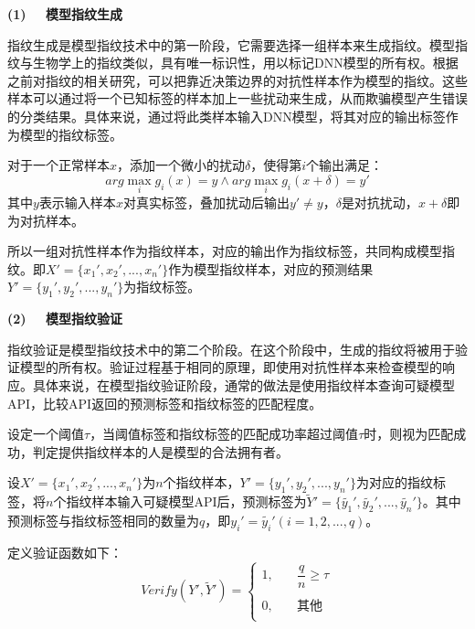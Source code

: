 \noindent\textbf{(1) \ \ 模型指纹生成}

指纹生成是模型指纹技术中的第一阶段，它需要选择一组样本来生成指纹。模型指纹与生物学上的指纹类似，具有唯一标识性，用以标记DNN模型的所有权。根据之前对指纹的相关研究\cite{zhao2020afa,lukas2019deep,cao2021ipguard}，可以把靠近决策边界的对抗性样本作为模型的指纹。这些样本可以通过将一个已知标签的样本加上一些扰动来生成，从而欺骗模型产生错误的分类结果。具体来说，通过将此类样本输入DNN模型，将其对应的输出标签作为模型的指纹标签。

对于一个正常样本$x$，添加一个微小的扰动$\delta$，使得第$i$个输出满足：
\begin{equation}
	\label{eq:4}
	arg \mathop{max} \limits_i g_i(x) = y \wedge arg \mathop{max} \limits_i g_i(x + \delta) = y'
\end{equation}
其中$y$表示输入样本$x$对真实标签，叠加扰动后输出$y' \neq y$，$\delta$是对抗扰动，$x + \delta$即为对抗样本。

所以一组对抗性样本作为指纹样本，对应的输出作为指纹标签，共同构成模型指纹。即$X' = \{x_1',x_2',...,x_n'\}$作为模型指纹样本，对应的预测结果$Y' = \{y_1', y_2',...,y_n'\}$为指纹标签。

\noindent\textbf{(2) \ \ 模型指纹验证}

指纹验证是模型指纹技术中的第二个阶段。在这个阶段中，生成的指纹将被用于验证模型的所有权。验证过程基于相同的原理，即使用对抗性样本来检查模型的响应。具体来说，在模型指纹验证阶段，通常的做法是使用指纹样本查询可疑模型API，比较API返回的预测标签和指纹标签的匹配程度。

设定一个阈值$\tau$，当阈值标签和指纹标签的匹配成功率超过阈值$\tau$时，则视为匹配成功，判定提供指纹样本的人是模型的合法拥有者。

设$X' = \{x_1',x_2',...,x_n'\}$为$n$个指纹样本，$Y' = \{y_1', y_2',...,y_n'\}$为对应的指纹标签，将$n$个指纹样本输入可疑模型API后，预测标签为$\widetilde{Y}' = \{\widetilde{y_1}', \widetilde{y_2}',...,\widetilde{y_n}'\}$。其中预测标签与指纹标签相同的数量为$q$，即$y_i' = \widetilde{y_i}'(i = 1, 2,...,q)$。

定义验证函数如下：
\begin{equation}
	\label{eq:5}
	Verify(Y', \widetilde{Y}')= \left
	\{ 
	\begin{array}{ll} 
		1, &\quad \dfrac{q}{n} \geq \tau \\ 
		\\
		0, &\quad \mbox{其他}\\ 
	\end{array} 
	\right.
\end{equation}

